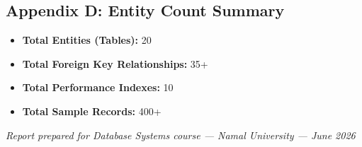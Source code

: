 \documentclass[12pt,a4paper]{report}
\begin{document}
\subsection*{Appendix D: Entity Count Summary}

\begin{itemize}[noitemsep]
    \item \textbf{Total Entities (Tables):} 20
    \item \textbf{Total Foreign Key Relationships:} 35+
    \item \textbf{Total Performance Indexes:} 10
    \item \textbf{Total Sample Records:} 400+
\end{itemize}

\vfill
\begin{center}
\textit{Report prepared for Database Systems course --- Namal University --- June 2026}
\end{center}
\end{document}
